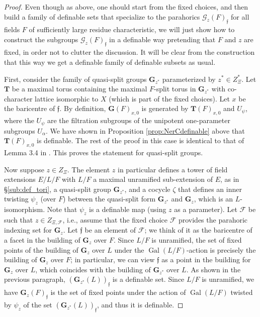 \documentclass{amsart}
\newcommand{\cF}{\mathcal{F}}
\newcommand{\cG}{\mathcal{G}}
\DeclareMathOperator{\gal}{Gal}
\newcommand{\bG}{\mathbf{G}}
\newcommand{\bT}{\mathbf {T}}
\newcommand{\ff}{{\mathfrak f}}
\theoremstyle{plain}
\theoremstyle{definition}
\begin{document}
\begin{proof} Even though as above, one should start from the fixed choices, 
and then build a family of definable sets that specialize to the parahorics ${\cG_z(F)}_\ff$ for all fields $F$ of sufficiently large residue characteristic, we will just show how to construct the subgroups 
${\cG_z(F)}_\ff$ in a definable way pretending that $F$ and $z$ are fixed, in order not to clutter the discussion. It will be clear from the construction that this way we get a definable family of definable subsets as usual. 

First, consider the family of quasi-split groups $\bG_{z^\ast}$ parameterized by 
$z^\ast\in Z_{\Xi}^\ast$. 
Let $\bT$ be a maximal torus containing the maximal $F$-split torus in 
$\bG_{z^\ast}$ with co-character lattice isomorphic to $X$ (which is part of the fixed choices).  
Let $x$ be the baricentre of $\ff$.
By definition, $\bG(F)_{x,0}$ is generated by $\bT(F)_{x, 0}$ and $U_\psi$, where the $U_\psi$ are
the filtration subgroups of the unipotent one-parameter subgroups $U_{\alpha}$. 
We have shown in Proposition \ref{prop:NerCdefinable} above that  $\bT(F)_{x, 0}$ is definable.
The rest of the proof in this case is identical to that of Lemma 3.4 in \cite{cluckers-gordon-halupczok:14b}. 
This proves the statement for quasi-split groups. 

Now suppose $z\in Z_\Xi$. The element $z$ in particular defines a tower of field extensions $E/L/F$ 
with $L/F$ a maximal unramified sub-extension of $E$, as in \S \ref{sub:def_tori}, a quasi-split group $\bG_{z^\ast}$,
 and a cocycle $\zeta$ that defines an inner twisting $\psi_z$ (over $F$) between the quasi-split form $\bG_{z^\ast}$ 
 and $\bG_z$, which is an $L$-isomorphism.  Note that $\psi_z$ is a definable map (using $z$ as a parameter). 
Let $\cF$ be such that $z\in Z_{\Xi, \cF}$, i.e., assume that the fixed choice $\cF$ provides the parahoric indexing 
set for $\bG_z$. Let $\ff$ be an element of $\cF$; we think of it as the baricentre of a facet in the building of 
$\bG_z$ over $F$. Since $L/F$ is unramified, the set of fixed points of the building of $\bG_z$ over $L$ 
under the $\gal(L/F)$-action is precisely the building of $\bG_z$ over $F$; in particular, we can view $\ff$ as a point 
in the building for $\bG_z$ over $L$, which coincides with the building of $\bG_{z^\ast}$ over $L$.  
As shown in the previous paragraph, $(\bG_{z^\ast}(L))_\ff$ is a definable set. 
Since $L/F$ is unramified, we have $\bG_{z}(F)_\ff$ is the set of fixed points under the action of $\gal(L/F)$ twisted by $\psi_z$ of the set  $(\bG_{z^\ast}(L))_\ff$, and thus it is definable. 
\end{proof} 
\end{document}
